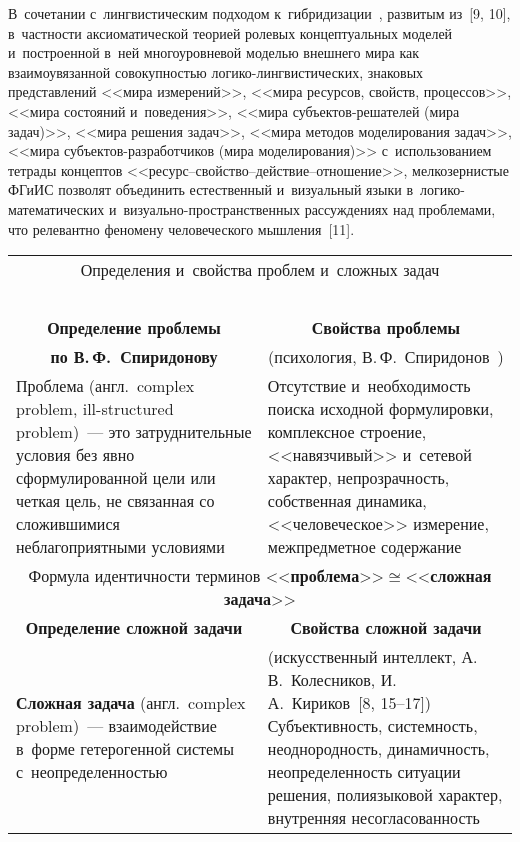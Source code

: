 \begin{multicols}{2}
В~сочетании с~лингвистическим подходом 
  к~гиб\-ри\-дизации~\cite{6-kir,8-kir}, развитым из~[9, 10], в~част\-ности аксиоматической 
теорией ролевых концептуальных моделей и~построенной в~ней многоуровневой моделью 
внешнего мира как взаимоувязанной совокупностью ло\-ги\-ко-лингви\-сти\-че\-ских, 
знаковых представлений <<мира измерений>>, <<мира ресурсов, свойств, процессов>>, 
<<мира состояний и~поведения>>, <<мира субъ\-ек\-тов-ре\-ша\-те\-лей (мира задач)>>, 
<<мира решения задач>>, <<мира методов моделирования задач>>, <<мира  
субъ\-ек\-тов-раз\-ра\-бот\-чи\-ков (мира моделирования)>> с~использованием тет\-ра\-ды 
концептов <<ре\-сурс--свой\-ст\-во--дей\-ст\-вие--от\-но\-ше\-ние>>, мелкозернистые ФГиИС 
позволят объединить естественный и~визуальный языки в~ло\-ги\-ко-ма\-те\-ма\-ти\-че\-ских  
и~ви\-зу\-аль\-но-про\-стран\-ст\-вен\-ных рассуждениях над проблемами, что релевантно 
феномену человеческого мышления~[11]. 

\begin{table*}[b]\small
\begin{center}

\begin{tabular}{|p{70mm}|p{70mm}|}
\multicolumn{2}{c}{Определения и~свойства проблем и~сложных задач}\\
\multicolumn{2}{c}{\ }\\[-6pt]
\hline
\multicolumn{1}{|c|}{\textbf{Определение проблемы}} &
\multicolumn{1}{c|}{\textbf{Свойства проблемы}}\\
\multicolumn{1}{|c|}{\textbf{по В.\,Ф.~Спиридонову}}  & 
\multicolumn{1}{c|}{ (психология, В.\,Ф.~Спиридонов~\cite{14-kir})}\\
Проблема (англ.\ complex problem, ill-structured problem)~--- это затруднительные условия 
без явно сформулированной цели или четкая цель, не связанная со сложившимися 
неблагоприятными условиями&
Отсутствие и~необходимость поиска исходной формулировки, комплексное строение, 
<<навязчивый>> и~сетевой характер, непрозрачность, собственная динамика, <<человеческое>> 
измерение, межпредметное содержание\\
\hline
\multicolumn{2}{|c|}{Формула идентичности терминов
<<\textbf{проблема}>>\;$\cong$\;<<\textbf{сложная задача}>>}\\
\hline
\multicolumn{1}{|c|}{\textbf{Определение сложной задачи}} &
\multicolumn{1}{c|}{\textbf{Свойства сложной задачи}}\\
\textbf{Сложная задача} (англ.\ complex problem)~--- взаимодействие в~форме гетерогенной системы 
с~неопределенностью &
(искусственный интеллект, А.\,В.~Колесников,\newline  
И.\,А.~Кириков~[8, 15--17])\newline
Субъективность, системность, неоднородность, динамичность, неопределенность ситуации решения, 
полиязыковой характер, внутренняя несогласованность\\
\hline
\end{tabular}
\end{center}
\end{table*}
  

\end{multicols}
